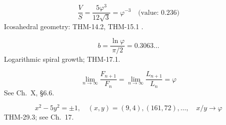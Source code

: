 \begin{equation}\label{eq:icosa-VS}
\frac{V}{S} = \frac{5\varphi^{3}}{12\sqrt{3}} = \varphi^{-3}
\quad\text{(value: }0.236\text{)}
\end{equation}
Icosahedral geometry: THM-14.2, THM-15.1
\cite{coxeter_regular_polytopes}.

\begin{equation}\label{eq:spiral}
b = \frac{\ln\varphi}{\pi/2} = 0.3063\ldots
\end{equation}
Logarithmic spiral growth; THM-17.1.

\begin{equation}\label{eq:fib-limit}
\lim_{n\to\infty}\frac{F_{n+1}}{F_n}
= \lim_{n\to\infty}\frac{L_{n+1}}{L_n} = \varphi
\end{equation}
See \cite{hardy_wright} Ch.\ X, \cite{knuth_concrete_math} \S6.6.

\begin{equation}\label{eq:pell}
x^{2}-5y^{2} = \pm 1,\quad
(x,y) = (9,4),(161,72),\ldots,\quad
x/y\to\varphi
\end{equation}
THM-29.3; see \cite{ireland_rosen} Ch.\ 17.

